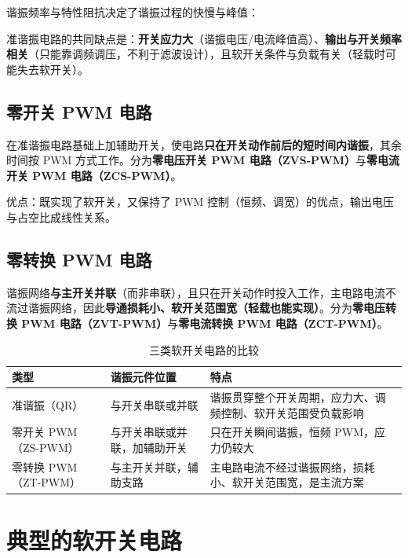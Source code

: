 谐振频率与特性阻抗决定了谐振过程的快慢与峰值：


准谐振电路的共同缺点是：\textbf{开关应力大}（谐振电压/电流峰值高）、\textbf{输出与开关频率相关}（只能靠调频调压，不利于滤波设计），且软开关条件与负载有关（轻载时可能失去软开关）。

\subsection{零开关 PWM 电路}

在准谐振电路基础上加辅助开关，使电路\textbf{只在开关动作前后的短时间内谐振}，其余时间按 PWM 方式工作。分为\textbf{零电压开关 PWM 电路（ZVS-PWM）}与\textbf{零电流开关 PWM 电路（ZCS-PWM）}。

优点：既实现了软开关，又保持了 PWM 控制（恒频、调宽）的优点，输出电压与占空比成线性关系。

\subsection{零转换 PWM 电路}

谐振网络\textbf{与主开关并联}（而非串联），且只在开关动作时投入工作，主电路电流不流过谐振网络，因此\textbf{导通损耗小、软开关范围宽（轻载也能实现）}。分为\textbf{零电压转换 PWM 电路（ZVT-PWM）}与\textbf{零电流转换 PWM 电路（ZCT-PWM）}。

\begin{table}[htbp]
\centering
\caption{三类软开关电路的比较}
\label{tab:8-1}
\begin{tabular}{p{3.2cm}p{4.2cm}p{6.6cm}}
\toprule
\textbf{类型} & \textbf{谐振元件位置} & \textbf{特点} \\
\midrule
准谐振（QR） & 与开关串联或并联 & 谐振贯穿整个开关周期，应力大、调频控制、软开关范围受负载影响 \\
零开关 PWM（ZS-PWM） & 与开关串联或并联，加辅助开关 & 只在开关瞬间谐振，恒频 PWM，应力仍较大 \\
零转换 PWM（ZT-PWM） & 与主开关并联，辅助支路 & 主电路电流不经过谐振网络，损耗小、软开关范围宽，是主流方案 \\
\bottomrule
\end{tabular}
\end{table}

\section{典型的软开关电路}

